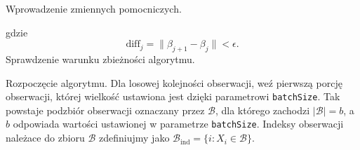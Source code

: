 \begin{Shaded}
\begin{Highlighting}[]
    \StringTok{ }\NormalTok{(}\NormalTok{:}
    \StringTok{ }
    \StringTok{ }
  \NormalTok{\}}
\end{Highlighting}
\end{Shaded}

Wprowadzenie zmiennych pomocniczych.

\begin{Shaded}
\begin{Highlighting}[]
  \StringTok{ } 
  \StringTok{ } 
  \StringTok{ } 
  \StringTok{ }
  \StringTok{ }\NormalTok{(}
  \StringTok{ }
  \StringTok{ }
\end{Highlighting}
\end{Shaded}

gdzie
\[ \text{diff}_{j} = \parallel \beta_{j+1}-\beta_j\parallel < \epsilon .\]
Sprawdzenie warunku zbieżności algorytmu.

\begin{Shaded}
\begin{Highlighting}[]
  \StringTok{ } \NormalTok{|}\StringTok{ }\StringTok{ }\StringTok{ }\StringTok{ }
    \StringTok{ }
    \StringTok{ }
\end{Highlighting}
\end{Shaded}

Rozpoczęcie algorytmu. Dla losowej kolejności obserwacji, weź pierwszą
porcję obserwacji, której wielkość ustawiona jest dzięki parametrowi
\texttt{batchSize}. Tak powstaje podzbiór obserwacji oznaczany przez
\(\mathcal{B}\), dla którego zachodzi \(|\mathcal{B}| = b\), a \(b\)
odpowiada wartości ustawionej w parametrze \texttt{batchSize}. Indeksy
obserwacji należace do zbioru \(\mathcal{B}\) zdefiniujmy jako
\(\mathcal{B}_{\text{ind}} = \{i: X_i \in \mathcal{B} \}\).

